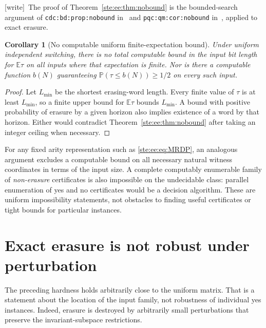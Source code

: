 \documentclass[11pt,letterpaper]{article}
\newtheorem{corollary}[theorem]{Corollary}
\theoremstyle{definition}
\theoremstyle{remark}
\newcommand{\EE}{\mathbb E}
\newcommand{\PP}{\mathbb P}
\newcommand{\wtag}{\textup{[write]}}
\begin{document}
\wtag\ The proof of Theorem~\ref{ste:ee:thm:nobound} is the bounded-search argument of \texttt{cdc:bd:prop:nobound} in~\cite{cdc} and \texttt{pqc:qm:cor:nobound} in~\cite{pqc}, applied to exact erasure.

\begin{corollary}[No computable uniform finite-expectation bound]\label{ste:ee:cor:expectbound}
Under uniform independent switching, there is no total computable bound in the
input bit length for $\EE\tau$ on all inputs where that expectation is finite.
Nor is there a computable function $b(N)$ guaranteeing
$\PP(\tau\leq b(N))\geq1/2$ on every such input.
\end{corollary}
\begin{proof}
Let $L_{\min}$ be the shortest erasing-word length. Every finite value of $\tau$
is at least $L_{\min}$, so a finite upper bound for $\EE\tau$ bounds
$L_{\min}$. A bound with positive probability of erasure by a given horizon also
implies existence of a word by that horizon. Either would contradict
Theorem~\ref{ste:ee:thm:nobound} after taking an integer ceiling when necessary.
\end{proof}

For any fixed arity representation such as \eqref{ste:ee:eq:MRDP}, an analogous argument
excludes a computable bound on all necessary natural witness coordinates in
terms of the input size. A complete computably enumerable family of
\emph{non-erasure} certificates is also impossible on the undecidable class:
parallel enumeration of yes and no certificates would be a decision algorithm.
These are uniform impossibility statements, not obstacles to finding useful
certificates or tight bounds for particular instances.

\section{Exact erasure is not robust under perturbation}
\label{ste:ee:sec:perturbation}

The preceding hardness holds arbitrarily close to the uniform matrix. That is a
statement about the location of the input family, not robustness of individual
yes instances. Indeed, erasure is destroyed by arbitrarily small perturbations
that preserve the invariant-subspace restrictions.
\end{document}
